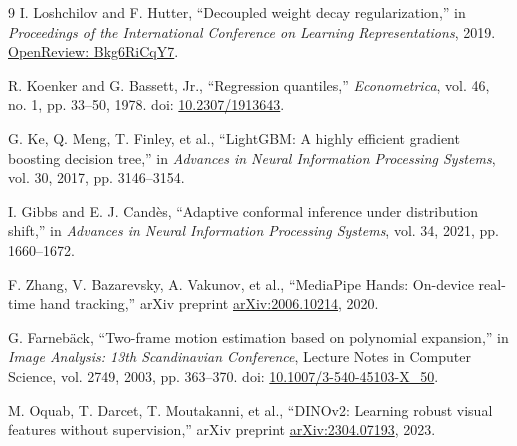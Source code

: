 \begin{thebibliography}{9}
I. Loshchilov and F. Hutter, ``Decoupled weight decay regularization,'' in \textit{Proceedings of the International Conference on Learning Representations}, 2019. \href{https://openreview.net/forum?id=Bkg6RiCqY7}{OpenReview: Bkg6RiCqY7}.

R. Koenker and G. Bassett, Jr., ``Regression quantiles,'' \textit{Econometrica}, vol. 46, no. 1, pp. 33--50, 1978. doi: \href{https://doi.org/10.2307/1913643}{10.2307/1913643}.

G. Ke, Q. Meng, T. Finley, et al., ``LightGBM: A highly efficient gradient boosting decision tree,'' in \textit{Advances in Neural Information Processing Systems}, vol. 30, 2017, pp. 3146--3154.

I. Gibbs and E. J. Cand\`es, ``Adaptive conformal inference under distribution shift,'' in \textit{Advances in Neural Information Processing Systems}, vol. 34, 2021, pp. 1660--1672.

F. Zhang, V. Bazarevsky, A. Vakunov, et al., ``MediaPipe Hands: On-device real-time hand tracking,'' arXiv preprint \href{https://arxiv.org/abs/2006.10214}{arXiv:2006.10214}, 2020.

G. Farneb\"ack, ``Two-frame motion estimation based on polynomial expansion,'' in \textit{Image Analysis: 13th Scandinavian Conference}, Lecture Notes in Computer Science, vol. 2749, 2003, pp. 363--370. doi: \href{https://doi.org/10.1007/3-540-45103-X_50}{10.1007/3-540-45103-X\_50}.

M. Oquab, T. Darcet, T. Moutakanni, et al., ``DINOv2: Learning robust visual features without supervision,'' arXiv preprint \href{https://arxiv.org/abs/2304.07193}{arXiv:2304.07193}, 2023.
\end{thebibliography}
